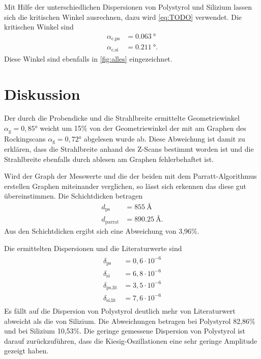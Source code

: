 Mit Hilfe der unterschiedlichen Dispersionen von Polystyrol und Silizium lassen sich die kritischen Winkel ausrechnen,
dazu wird \autoref{eq:TODO} verwendet.
Die kritischen Winkel sind
\begin{align*}
    \alpha_\text{c,ps}& = \SI{0,063}{\degree}\\
    \alpha_\text{c,si}& = \SI{0.211}{\degree}.
\end{align*}
Diese Winkel sind ebenfalls in \autoref{fig:alles} eingezeichnet.

\section{Diskussion}
Der durch die Probendicke und die Strahlbreite ermittelte Geometriewinkel $\alpha_\text{g} =0,85°$ weicht um 15\%
von der Geometriewinkel der mit am Graphen des Rockingscans $\alpha_\text{g} =0,72°$ abgelesen wurde ab. 
Diese Abweichung ist damit zu erklären, dass die Strahlbreite anhand des Z-Scans bestimmt worden ist und die Strahlbreite
ebenfalls durch ablesen am Graphen fehlerbehaftet ist.

Wird der Graph der Messwerte und die der beiden mit dem Parratt-Algorithmus erstellen Graphen miteinander verglichen, so lässt sich 
erkennen das diese gut übereinstimmen.
Die Schichtdicken betragen
\begin{align*}
    d_\text{ps} &= \SI{855}{\angstrom}\\
    d_\text{parrat} &= \SI{890,25}{\angstrom}.
\end{align*}
Aus den Schichtdicken ergibt sich eine Abweichung von 3,96\%.

Die ermittelten Dispersionen und die Literaturwerte\cite{V44old} sind
\begin{align}
    \begin{split}    
        \delta_\text{ps} &= 0,6\cdot 10^{-6}\\
        \delta_\text{si}&= 6,8\cdot 10^{-6} \\
        \delta_\text{ps,lit} &= 3,5\cdot 10^{-6}\\
        \delta_\text{si,lit}&= 7,6\cdot 10^{-6}
    \end{split} 
\end{align}
Es fällt auf die Dispersion von Polystyrol deutlich mehr von Literaturwert abweicht als die von Silizium.
Die Abweichungen betragen bei Polystyrol 82,86\% und bei Silizium 10,53\%.
Die geringe gemessene Dispersion von Polystyrol ist darauf zurückzuführen, dass die Kiesig-Oszillationen eine
sehr geringe Amplitude gezeigt haben.

